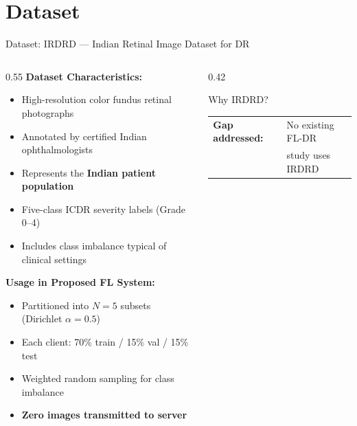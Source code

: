 \documentclass[aspectratio=169, 11pt]{beamer}
\begin{document}
\section{Dataset}

\begin{frame}{Dataset: IRDRD --- Indian Retinal Image Dataset for DR}
  \begin{columns}[T]
    \begin{column}{0.55\textwidth}
      \textbf{Dataset Characteristics:}
      \begin{itemize}\small
        \item High-resolution color fundus retinal photographs
        \item Annotated by certified Indian ophthalmologists
        \item Represents the \textbf{Indian patient population}
        \item Five-class ICDR severity labels (Grade 0--4)
        \item Includes class imbalance typical of clinical settings
      \end{itemize}
      \vspace{4pt}
      \textbf{Usage in Proposed FL System:}
      \begin{itemize}\small
        \item Partitioned into $N=5$ subsets (Dirichlet $\alpha=0.5$)
        \item Each client: 70\% train / 15\% val / 15\% test
        \item Weighted random sampling for class imbalance
        \item \textbf{Zero images transmitted to server}
      \end{itemize}
    \end{column}
    \begin{column}{0.42\textwidth}
      \begin{block}{Why IRDRD?}
        \small\renewcommand{\arraystretch}{1.2}
        \begin{tabular}{ll}
          \textbf{Gap addressed:} & No existing FL-DR \\
                                  & study uses IRDRD \\

\end{tabular}
\end{block}
\end{column}
\end{columns}
\end{frame}
\end{document}
